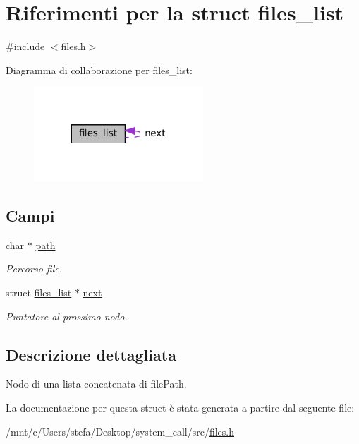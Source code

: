 \hypertarget{structfiles__list}{}\section{Riferimenti per la struct files\+\_\+list}
\label{structfiles__list}


{\ttfamily \#include $<$files.\+h$>$}



Diagramma di collaborazione per files\+\_\+list\+:
\nopagebreak
\begin{figure}[H]
\begin{center}
\leavevmode
\includegraphics[width=180pt]{structfiles__list__coll__graph}
\end{center}
\end{figure}
\subsection*{Campi}
\begin{DoxyCompactItemize}
\item 
\mbox{\label{structfiles__list_a986ecc1174faf39b15c1ef655c2ed966}} 
char $\ast$ \hyperlink{structfiles__list_a986ecc1174faf39b15c1ef655c2ed966}{path}
\begin{DoxyCompactList}\small\item\em Percorso file. \end{DoxyCompactList}\item 
\mbox{\label{structfiles__list_a3cdd0098b7fb9589480f8a9facad90ce}} 
struct \hyperlink{structfiles__list}{files\+\_\+list} $\ast$ \hyperlink{structfiles__list_a3cdd0098b7fb9589480f8a9facad90ce}{next}
\begin{DoxyCompactList}\small\item\em Puntatore al prossimo nodo. \end{DoxyCompactList}\end{DoxyCompactItemize}


\subsection{Descrizione dettagliata}
Nodo di una lista concatenata di file\+Path. 

La documentazione per questa struct è stata generata a partire dal seguente file\+:\begin{DoxyCompactItemize}
\item 
/mnt/c/\+Users/stefa/\+Desktop/system\+\_\+call/src/\hyperlink{files_8h}{files.\+h}\end{DoxyCompactItemize}
